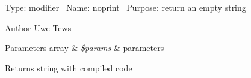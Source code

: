 Type\+: modifier~\newline
 Name\+: noprint~\newline
 Purpose\+: return an empty string

\begin{DoxyAuthor}{Author}
Uwe Tews 
\end{DoxyAuthor}

\begin{DoxyParams}[1]{Parameters}
array & {\em \$params} & parameters \\
\hline
\end{DoxyParams}
\begin{DoxyReturn}{Returns}
string with compiled code 
\end{DoxyReturn}
